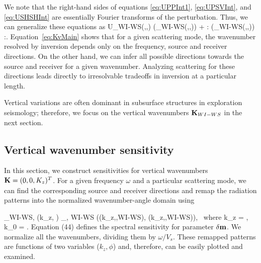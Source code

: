 

We note that the right-hand sides of equations \eqref{eq:UPPInt1}, \eqref{eq:UPSVInt}, and \eqref{eq:USHSHInt} are essentially Fourier transforms of the perturbation. Thus, we can generalize these equations as 
\beq \label{eq:KvMain}
\delta U_{WI-WS}(\sv,\gv,\omega) \propto \spv\cdot\gpv \delta \hat{\rho}(\Kv_{WI-WS}(\sv,\gv,\omega)) + \sv\spv : \delta \hat{\cv}(\Kv_{WI-WS}(\sv,\gv,\omega)) :\gv\gpv.
\eeq
Equation~\eqref{eq:KvMain} shows that for a given scattering mode, the wavenumber resolved by inversion depends only on the frequency, source and receiver directions. On the other hand, we can infer all possible directions towards the source and receiver for a given wavenumber. Analyzing scattering for these directions leads directly to irresolvable tradeoffs in inversion at a particular length.

Vertical variations are often dominant in subsurface structures in exploration seismology; therefore, we focus on the vertical wavenumbers $\mathbf{K}_{WI-WS}$ in the next section.



\subsection{Vertical wavenumber sensitivity}

In this section, we construct sensitivities for vertical wavenumbers $\mathbf{K} = (0,0,K_z)^T$.
%
For a given frequency $\omega$ and a particular scattering mode, we can find the corresponding source and receiver directions and remap the radiation patterns into the normalized wavenumber-angle domain using 

\beq \label{eq:sensDef}
\Sp_{WI-WS,\delta \mv} (k_z, \varphi) \equiv \Dp_{\delta \mv, WI-WS} (\sv(k_z,\varphi,WI-WS), \gv(k_z,\varphi,WI-WS)),~
\eeq
where
\beq
k_z = ,~
k_{0} = . 
\eeq
Equation (44) defines the spectral sensitivity for parameter 
$\delta \mathbf{m}$. We normalize all the wavenumbers, dividing them by $\omega/V_s$. %
These remapped patterns are functions of two variables ($k_z,\phi$) and, therefore, can be easily plotted and examined. 

